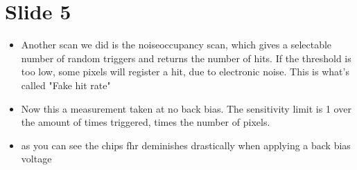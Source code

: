 \section*{Slide 5} 
\begin{itemize}
    \item Another scan we did is the noiseoccupancy scan, which gives a
	selectable number of random triggers and returns the number of hits.
	If the threshold is too low, some pixels will register a hit, due
	to electronic noise. This is what's called "Fake hit rate"
    \item Now this a measurement taken at no back bias. The sensitivity limit
	is 1 over the amount of times triggered, times the number of pixels.
    \item as you can see the chips fhr deminishes drastically when applying a
	back bias voltage
\end{itemize}
